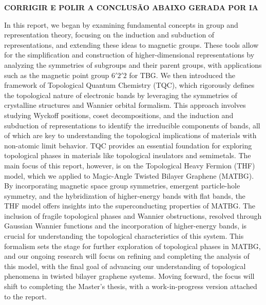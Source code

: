 \documentclass[12pt]{report}
\begin{document}
\textbf{CORRIGIR E POLIR A CONCLUSÃO ABAIXO GERADA POR IA}

In this report, we began by examining fundamental concepts in group and representation theory, focusing on the induction and subduction of representations, and extending these ideas to magnetic groups. These tools allow for the simplification and construction of higher-dimensional representations by analyzing the symmetries of subgroups and their parent groups, with applications such as the magnetic point group \( 6'2'2 \) for TBG. We then introduced the framework of Topological Quantum Chemistry (TQC), which rigorously defines the topological nature of electronic bands by leveraging the symmetries of crystalline structures and Wannier orbital formalism. This approach involves studying Wyckoff positions, coset decompositions, and the induction and subduction of representations to identify the irreducible components of bands, all of which are key to understanding the topological implications of materials with non-atomic limit behavior. TQC provides an essential foundation for exploring topological phases in materials like topological insulators and semimetals. The main focus of this report, however, is on the Topological Heavy Fermion (THF) model, which we applied to Magic-Angle Twisted Bilayer Graphene (MATBG). By incorporating magnetic space group symmetries, emergent particle-hole symmetry, and the hybridization of higher-energy bands with flat bands, the THF model offers insights into the superconducting properties of MATBG. The inclusion of fragile topological phases and Wannier obstructions, resolved through Gaussian Wannier functions and the incorporation of higher-energy bands, is crucial for understanding the topological characteristics of this system. This formalism sets the stage for further exploration of topological phases in MATBG, and our ongoing research will focus on refining and completing the analysis of this model, with the final goal of advancing our understanding of topological phenomena in twisted bilayer graphene systems. Moving forward, the focus will shift to completing the Master's thesis, with a work-in-progress version attached to the report.
\end{document}
